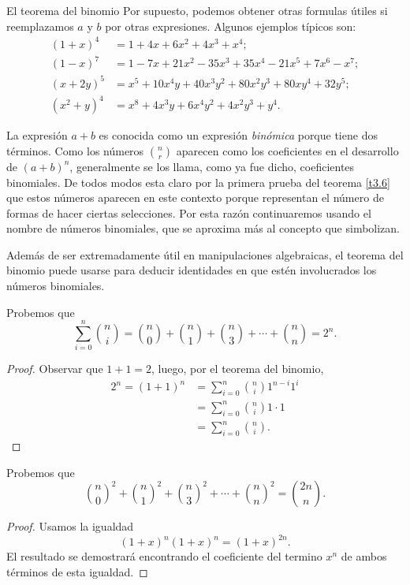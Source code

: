 \begin{section}{El teorema del binomio}
Por supuesto, podemos obtener otras formulas útiles si
reemplazamos $a$ y $b$ por otras expresiones. Algunos ejemplos
típicos son:
$$\begin{aligned}
(1+x)^4 &= 1 + 4x + 6x^2+ 4x^3+ x^4;\\
(1-x)^7 &= 1 -7x + 21x^2- 35x^3+ 35x^4- 21x^5+ 7x^6 -x^7;\\
(x+2y)^5 &= x^5 + 10 x^4 y + 40 x^3 y^2+80 x^2 y^3+80 x y^4+32 y^5; \\
(x^2+y)^4 &= x^8 +4 x^3 y +6 x^4 y^2 +4 x^2 y^3 + y^4.
\end{aligned}
$$




La expresión $a+b$ es conocida como un expresión \textit{binómica}
porque tiene dos términos. Como los números   $\binom{n}{r}$ aparecen como los coeficientes en el
desarrollo de $(a+b)^n$, generalmente se los llama, como ya fue dicho, 
coeficientes binomiales.  
De todos modos esta claro por la primera prueba del teorema \ref{t3.6} que
estos números aparecen en este contexto porque representan el
número de formas de hacer ciertas selecciones. Por esta razón
continuaremos usando el nombre de números binomiales,
 que se aproxima más al concepto que
simbolizan.

Además de ser extremadamente útil en manipulaciones algebraicas,
el teorema del binomio puede usarse para deducir identidades en
que estén involucrados los números binomiales.

\begin{ejemplo*} Probemos que 
    \begin{equation*}
    \sum_{i=0}^{n}\binom{n}{i} = \binom{n}{0}+\binom{n}{1}+\binom{n}{3}+\cdots+\binom{n}{n}= 2^n.
    \end{equation*}
\end{ejemplo*}
\begin{proof}
    Observar  que $1 + 1 = 2$, luego, por el teorema del binomio,
    \begin{align*}
        2^n = (1 +1)^n 
            &= \sum_{i=0}^{n} \binom{n}{i}1^{n-i}1^i \\
            &= \sum_{i=0}^{n} \binom{n}{i}1 \cdot 1 \\
            &= \sum_{i=0}^{n} \binom{n}{i}.
    \end{align*} 
\end{proof}

\begin{ejemplo*}Probemos que
\begin{equation}\label{eqcuaddo}
\binom{n}{0}^2+\binom{n}{1}^2+\binom{n}{3}^2+\cdots+\binom{n}{n}^2=
\binom{2n}{n}.
\end{equation}
\end{ejemplo*}
\begin{proof}
Usamos la igualdad
\begin{equation*}\label{eqxn}
(1+x)^n(1+x)^n=(1+x)^{2n}.
\end{equation*}
El resultado se demostrará encontrando el coeficiente del termino $x^n$ de ambos términos de esta igualdad.


\end{proof}
\end{section}
